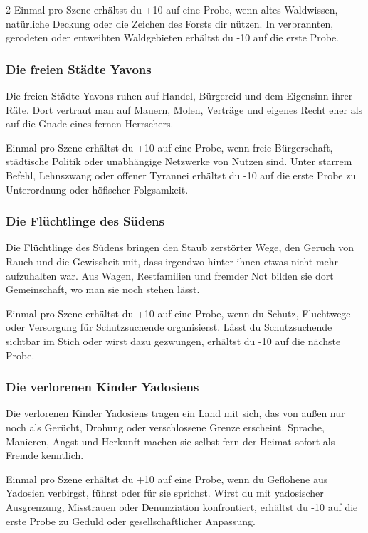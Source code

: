 {\begin{multicols*}{2}
        \bindungspielwertebox
        {Einmal pro Szene erhältst du +10 auf eine Probe, wenn altes Waldwissen, natürliche Deckung oder die Zeichen des Forsts dir nützen.}
        {In verbrannten, gerodeten oder entweihten Waldgebieten erhältst du -10 auf die erste Probe.}

        \subsubsection*{Die freien Städte Yavons}
        Die freien Städte Yavons ruhen auf Handel, Bürgereid und dem Eigensinn ihrer Räte. Dort vertraut man auf Mauern, Molen, Verträge und eigenes Recht eher als auf die Gnade eines fernen Herrschers.

        \bindungspielwertebox
        {Einmal pro Szene erhältst du +10 auf eine Probe, wenn freie Bürgerschaft, städtische Politik oder unabhängige Netzwerke von Nutzen sind.}
        {Unter starrem Befehl, Lehnszwang oder offener Tyrannei erhältst du -10 auf die erste Probe zu Unterordnung oder höfischer Folgsamkeit.}

        \subsubsection*{Die Flüchtlinge des Südens}
        Die Flüchtlinge des Südens bringen den Staub zerstörter Wege, den Geruch von Rauch und die Gewissheit mit, dass irgendwo hinter ihnen etwas nicht mehr aufzuhalten war. Aus Wagen, Restfamilien und fremder Not bilden sie dort Gemeinschaft, wo man sie noch stehen lässt.

        \bindungspielwertebox
        {Einmal pro Szene erhältst du +10 auf eine Probe, wenn du Schutz, Fluchtwege oder Versorgung für Schutzsuchende organisierst.}
        {Lässt du Schutzsuchende sichtbar im Stich oder wirst dazu gezwungen, erhältst du -10 auf die nächste Probe.}

        \subsubsection*{Die verlorenen Kinder Yadosiens}
        Die verlorenen Kinder Yadosiens tragen ein Land mit sich, das von außen nur noch als Gerücht, Drohung oder verschlossene Grenze erscheint. Sprache, Manieren, Angst und Herkunft machen sie selbst fern der Heimat sofort als Fremde kenntlich.

        \bindungspielwertebox
        {Einmal pro Szene erhältst du +10 auf eine Probe, wenn du Geflohene aus Yadosien verbirgst, führst oder für sie sprichst.}
        {Wirst du mit yadosischer Ausgrenzung, Misstrauen oder Denunziation konfrontiert, erhältst du -10 auf die erste Probe zu Geduld oder gesellschaftlicher Anpassung.}


\end{multicols*}}
